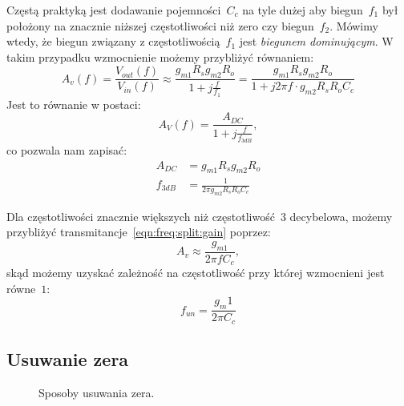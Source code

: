 \documentclass[twoside,pl,final]{labman}
\begin{document}
Częstą praktyką jest dodawanie pojemności~$C_c$ na tyle dużej aby biegun~$f_1$
był położony na znacznie niższej częstotliwości niż zero czy biegun~$f_2$.
Mówimy wtedy, że biegun związany z częstotliwością~$f_1$ jest
\emph{biegunem dominującym}.
W takim przypadku wzmocnienie możemy przybliżyć równaniem:
\begin{equation}
  A_v(f) = \frac{V_{out}(f)}{V_{in}(f)} \approx
  \frac{g_{m1} R_s g_{m2} R_o}{1 + j \frac{f}{f_1}} =
  \frac{g_{m1} R_s g_{m2} R_o}{1 + j 2 \pi f \cdot g_{m2} R_s R_o C_c}
  \label{eqn:freq:split:gain}
\end{equation}
Jest to równanie w postaci:
\begin{equation}
  A_V(f) = \frac{A_{DC}}{1 + j \frac{f}{f_{3dB}}},
\end{equation}
co pozwala nam zapisać:
\begin{align}
  A_{DC} &= g_{m1} R_s g_{m2} R_o
  \label{eqn:freq:split:dcgain} \\
  f_{3dB} &= \frac{1}{2 \pi g_{m2} R_s R_o C_c}
  \label{eqn:freq:split:bw}
\end{align}

Dla częstotliwości znacznie większych niż częstotliwość~$3$ decybelowa,
możemy przybliżyć transmitancje~\ref{eqn:freq:split:gain} poprzez:
\begin{equation}
  A_v \approx \frac{g_{m1}}{2 \pi f C_c},
\end{equation}
skąd możemy uzyskać zależność na częstotliwość
przy której wzmocnieni jest równe~$1$:
\begin{equation}
  f_{un} = \frac{g_m1}{2 \pi C_c}
  \label{eqn:freq:unity}
\end{equation}

\subsection{Usuwanie zera}
\label{freq:zero}

\begin{figure}[!htbp]
  \centering
  \qquad
  \caption{Sposoby usuwania zera.}
  \label{fig:zero:cancel}
\end{figure}
\end{document}
